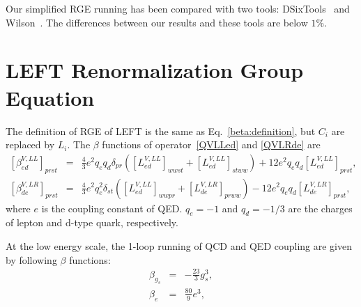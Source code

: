 \documentclass[a4paper,11pt]{article}
\begin{document}
Our simplified RGE running has been compared with two tools: DSixTools~\cite{Celis:2017hod,Fuentes-Martin:2020zaz} and Wilson~\cite{Aebischer:2018bkb}.
The differences between our results and these tools are below $1\%$.


\section{LEFT Renormalization Group Equation}\label{leftrge}

The definition of RGE of LEFT is the same as Eq.~\ref{beta:definition}, but $C_i$ are replaced by $L_i$.
The $\beta$ functions of operator~\ref{QVLLed} and \ref{QVLRde} are
\begin{eqnarray}
  \left[\beta^{V,LL}_{ed}\right]_{prst} &=& \frac{4}{3}e^2q_eq_d\delta_{pr}\left([L^{V,LL}_{ed}]_{wwst}+[L^{V,LL}_{ed}]_{stww}\right)+12e^2q_eq_d[L^{V,LL}_{ed}]_{prst},  \label{beta:VLLed} \\
  \left[\beta^{V,LR}_{de}\right]_{prst} &=& \frac{4}{3}e^2q^2_e\delta_{st}\left([L^{V,LL}_{ed}]_{wwpr}+[L^{V,LR}_{de}]_{prww}\right)-12e^2q_eq_d[L^{V,LR}_{de}]_{prst}, \label{beta:VLRde}
\end{eqnarray}
where $e$ is the coupling constant of QED. 
$q_e=-1$ and $q_d=-1/3$ are the charges of lepton and d-type quark, respectively. 

At the low energy scale, the 1-loop running of QCD and QED coupling are given by following $\beta$ functions:
\begin{eqnarray}
  \beta_{g_s} &=& -\frac{23}{3}g^3_s,  \\
  \beta_{e} &=& \frac{80}{9}e^3, 
\end{eqnarray}







		
		

		
\end{document}
